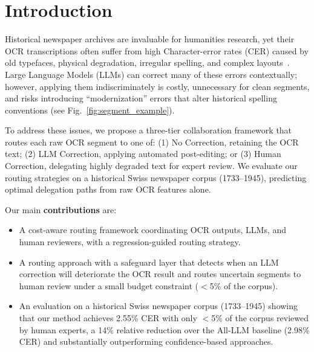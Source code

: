 \documentclass[sigconf]{acmart}
\begin{document}




\maketitle

\section{Introduction}
Historical newspaper archives are invaluable for humanities research, yet their OCR transcriptions often suffer from high Character-error rates (CER) caused by old typefaces, physical degradation, irregular spelling, and complex layouts~\cite{holley2009good,alex2012digitised,piryani2025evaluating}. Large Language Models (LLMs) can correct many of these errors contextually; however, applying them indiscriminately is costly, unnecessary for clean segments, and risks introducing ``modernization'' errors that alter historical spelling conventions (see Fig.~\ref{fig:segment_example}).

To address these issues, we propose a three-tier collaboration framework that routes each raw OCR segment to one of: (1) No Correction, retaining the OCR text; (2) LLM Correction, applying automated post-editing; or (3) Human Correction, delegating highly degraded text for expert review. We evaluate our routing strategies on a historical Swiss newspaper corpus (1733--1945), predicting optimal delegation paths from raw OCR features alone.

Our main \textbf{contributions} are:
\begin{itemize}
    \item A cost-aware routing framework coordinating OCR outputs, LLMs, and human reviewers, with a regression-guided routing strategy.
    \item A routing approach with a safeguard layer that detects when an LLM correction will deteriorate the OCR result and routes uncertain segments to human review under a small budget constraint ($<$5\% of the corpus).
    \item An evaluation on a historical Swiss newspaper corpus (1733--1945) showing that our method achieves 2.55\% CER with only $<$5\% of the corpus reviewed by human experts, a 14\% relative reduction over the All-LLM baseline (2.98\% CER) and substantially outperforming confidence-based approaches.
\end{itemize}
\end{document}
